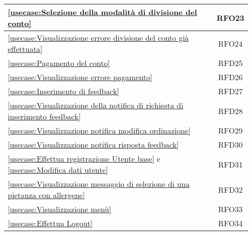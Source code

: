 \begin{longtable}{|l|c|}
	\hline
	\autoref{usecase:Selezione della modalità di divisione del conto}                                                                                            & RFO23                  \\
	\hline
	\autoref{usecase:Visualizzazione errore divisione del conto già effettuata}                                                                                  & RFO24                  \\
	\hline
	\autoref{usecase:Pagamento del conto}                                                                                                                        & RFD25                  \\
	\hline
	\autoref{usecase:Visualizzazione errore pagamento}                                                                                                           & RFD26                  \\
	\hline
	\autoref{usecase:Inserimento di feedback}                                                                                                                    & RFD27                  \\
	\hline
	\autoref{usecase:Visualizzazione della notifica di richiesta di inserimento feedback}                                                                        & RFD28                  \\
	\hline
	\autoref{usecase:Visualizzazione notifica modifica ordinazione}                                                                                              & RFO29                  \\
	\hline
	\autoref{usecase:Visualizzazione notifica risposta feedback}                                                                                                 & RFD30                  \\
	\hline
	\autoref{usecase:Effettua registrazione Utente base} e \autoref{usecase:Modifica dati utente}                                                                & RFD31                  \\
	\hline
	\autoref{usecase:Visualizzazione messaggio di selezione di una pietanza con allergene}                                                                       & RFD32                  \\
	\hline
	\autoref{usecase:Visualizzazione menù}                                                                                                                       & RFO33                  \\
	\hline
	\autoref{usecase:Effettua Logout}                                                                                                                            & RFO34                  \\

\end{longtable}
